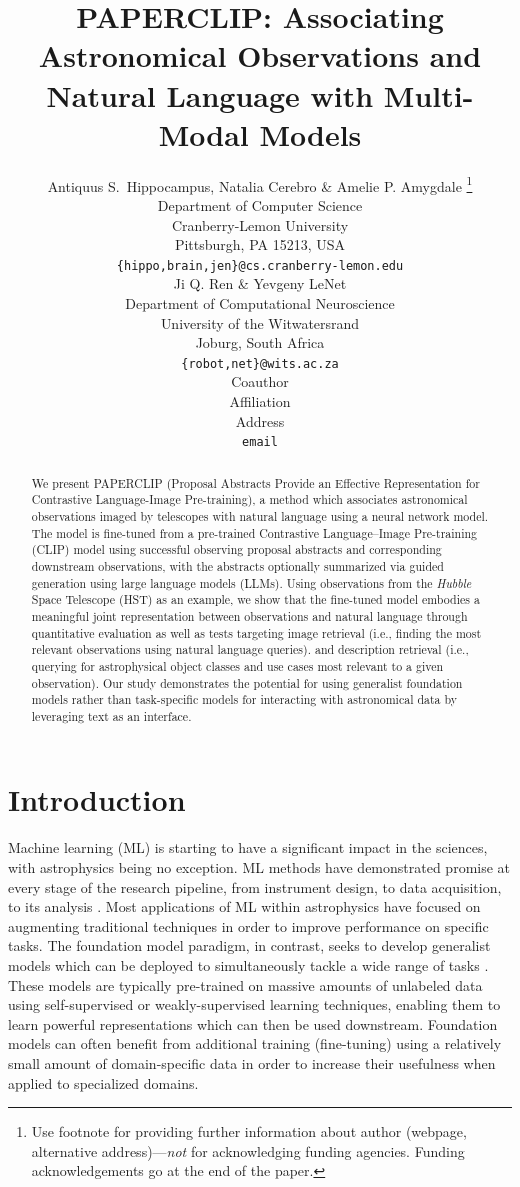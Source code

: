 \documentclass{article} %
\title{\textsc{PAPERCLIP}: Associating Astronomical Observations and Natural Language with Multi-Modal Models}
\author{Antiquus S.~Hippocampus, Natalia Cerebro \& Amelie P. Amygdale \thanks{ Use footnote for providing further information
about author (webpage, alternative address)---\emph{not} for acknowledging
funding agencies.  Funding acknowledgements go at the end of the paper.} \\
Department of Computer Science\\
Cranberry-Lemon University\\
Pittsburgh, PA 15213, USA \\
\texttt{\{hippo,brain,jen\}@cs.cranberry-lemon.edu} \\
\And
Ji Q. Ren \& Yevgeny LeNet \\
Department of Computational Neuroscience \\
University of the Witwatersrand \\
Joburg, South Africa \\
\texttt{\{robot,net\}@wits.ac.za} \\
\AND
Coauthor \\
Affiliation \\
Address \\
\texttt{email}
}
\newcommand{\hubble}{\emph{Hubble}\xspace}
\begin{document}
\maketitle

\begin{abstract}
   We present PAPERCLIP (Proposal Abstracts Provide an Effective Representation for Contrastive Language-Image Pre-training), a method which associates astronomical observations imaged by telescopes with natural language using a neural network model. The model is fine-tuned from a pre-trained Contrastive Language–Image Pre-training (CLIP) model using successful observing proposal abstracts and corresponding downstream observations, with the abstracts optionally summarized via guided generation using large language models (LLMs). Using observations from the \hubble Space Telescope (HST) as an example, we show that the fine-tuned model embodies a meaningful joint representation between observations and natural language through quantitative evaluation as well as tests targeting image retrieval (i.e., finding the most relevant observations using natural language queries).
  and description retrieval (i.e., querying for astrophysical object classes and use cases most relevant to a given observation). 
  Our study demonstrates the potential for using generalist foundation models rather than task-specific models for interacting with astronomical data by leveraging text as an interface.
\end{abstract}

\section{Introduction}
\label{sec:intro}

Machine learning (ML) is starting to have a significant impact in the sciences, with astrophysics being no exception.
%
ML methods have demonstrated promise at every stage of the research pipeline, from instrument design, to data acquisition, to its analysis \citep{huertas2022dawes}.
%
Most applications of ML within astrophysics have focused on augmenting traditional techniques in order to improve performance on specific tasks.
%
The {foundation model} paradigm, in contrast, seeks to develop generalist models which can be deployed to simultaneously tackle a wide range of tasks \citep{bommasani2021opportunities}.
%
These models are typically pre-trained on massive amounts of unlabeled data using self-supervised or weakly-supervised learning techniques, enabling them to learn powerful representations which can then be used downstream.
%
Foundation models can often benefit from additional training ({fine-tuning}) using a relatively small amount of domain-specific data in order to increase their usefulness when applied to specialized domains.
\end{document}
